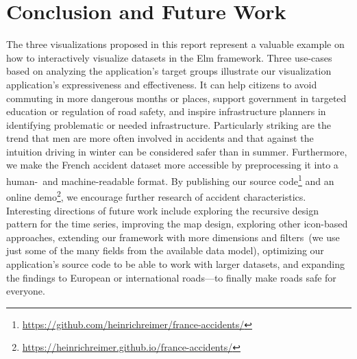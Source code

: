 \section{Conclusion and Future Work}
The three visualizations proposed in this report represent a valuable example on how to interactively visualize datasets in the Elm framework.
Three use-cases based on analyzing the application's target groups illustrate our visualization application's expressiveness and effectiveness.
It can \Ni help citizens to avoid commuting in more dangerous months or places, \Nii support government in targeted education or regulation of road safety, and \Niii inspire infrastructure planners in identifying problematic or needed infrastructure.
Particularly striking are the trend that men are more often involved in accidents and that against the intuition driving in winter can be considered safer than in summer.
Furthermore, we make the French accident dataset more accessible by preprocessing it into a human-~and machine-readable format.
By publishing our source code\footnote{\url{https://github.com/heinrichreimer/france-accidents/}} and an online demo\footnote{\url{https://heinrichreimer.github.io/france-accidents/}}, we encourage further research of accident characteristics.
Interesting directions of future work include exploring the recursive design pattern for the time series, improving the map design, exploring other icon-based approaches, extending our framework with more dimensions and filters~(we use just some of the many fields from the available data model), optimizing our application's source code to be able to work with larger datasets, and expanding the findings to European or international roads---to finally make roads safe for everyone.
